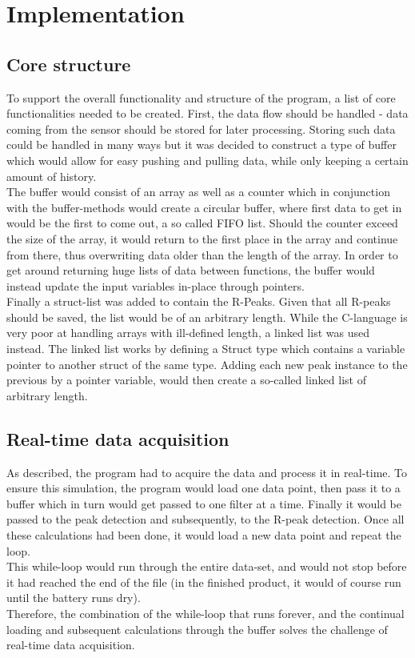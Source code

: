 \documentclass[12pt,a4paper]{article}
\begin{document}
\section{Implementation}
\subsection{Core structure}
To support the overall functionality and structure of the program, a list of core functionalities needed to be created. First, the data flow should be handled - data coming from the sensor should be stored for later processing. Storing such data could be handled in many ways but it was decided to construct a type of buffer which would allow for easy pushing and pulling data, while only keeping a certain amount of history.\\
The buffer would consist of an array as well as a counter which in conjunction with the buffer-methods would create a circular buffer, where first data to get in would be the first to come out, a so called FIFO list. Should the counter exceed the size of the array, it would return to the first place in the array and continue from there, thus overwriting data older than the length of the array.
In order to get around returning huge lists of data between functions, the buffer would instead update the input variables in-place through pointers.\\
Finally a struct-list was added to contain the R-Peaks. Given that all R-peaks should be saved, the list would be of an arbitrary length. While the C-language is very poor at handling arrays with ill-defined length, a linked list was used instead. The linked list works by defining a Struct type which contains a variable pointer to another struct of the same type. Adding each new peak instance to the previous by a pointer variable, would then create a so-called linked list of arbitrary length.

\subsection{Real-time data acquisition}
	As described, the program had to acquire the data and process it in real-time. To ensure this simulation, the program would load one data point, then pass it to a buffer which in turn would get passed to one filter at a time. Finally it would be passed to the peak detection and subsequently, to the R-peak detection. Once all these calculations had been done, it would load a new data point and repeat the loop.\\
	This while-loop would run through the entire data-set, and would not stop before it had reached the end of the file (in the finished product, it would of course run until the battery runs dry).\\
	Therefore, the combination of the while-loop that runs forever, and the continual loading and subsequent calculations through the buffer solves the challenge of real-time data acquisition.\\
\end{document}
